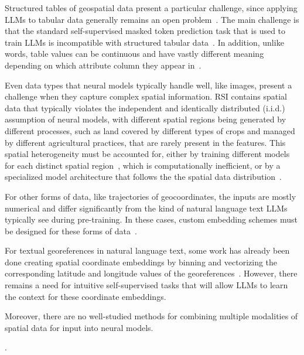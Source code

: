 Structured tables of geospatial data present a particular challenge, since applying LLMs to tabular data generally remains an open problem~\cite{Gao2023,Cong2023}.
The main challenge is that the standard self-supervised masked token prediction task that is used to train LLMs is incompatible with structured tabular data~\cite{Tan2023, Qi2023}.
In addition, unlike words, table values can be continuous and have vastly different meaning depending on which attribute column they appear in~\cite{Qi2023}.


Even data types that neural models typically handle well, like images, present a challenge when they capture complex spatial information.
%
RSI contains spatial data that typically violates the independent and identically distributed (i.i.d.) assumption of neural models, with different spatial regions being generated by different processes, such as land covered by different types of crops and managed by different agricultural practices, that are rarely present in the features. 
This spatial heterogeneity must be accounted for, either by training different models for each distinct spatial region~\cite{Gupta2021}, which is computationally inefficient, or by a specialized model architecture that follows the the spatial data distribution~\cite{Xie2021b}.


For other forms of data, like trajectories of geocoordinates, the inputs are mostly numerical and differ significantly from the kind of natural language text LLMs typically see during pre-training.
In these cases, custom embedding schemes must be designed for these forms of data~\cite{Hu2023}.
%
%

For textual georeferences in natural language text, some work has already been done creating spatial coordinate embeddings by binning and vectorizing the corresponding latitude and longitude values of the georeferences~\cite{Li2021}.
However, there remains a need for intuitive self-supervised tasks that will allow LLMs to learn the context for these coordinate embeddings.
%

Moreover, there are no well-studied methods for combining multiple modalities of spatial data for input into neural models.

 \cite{Trappolini2023}.


